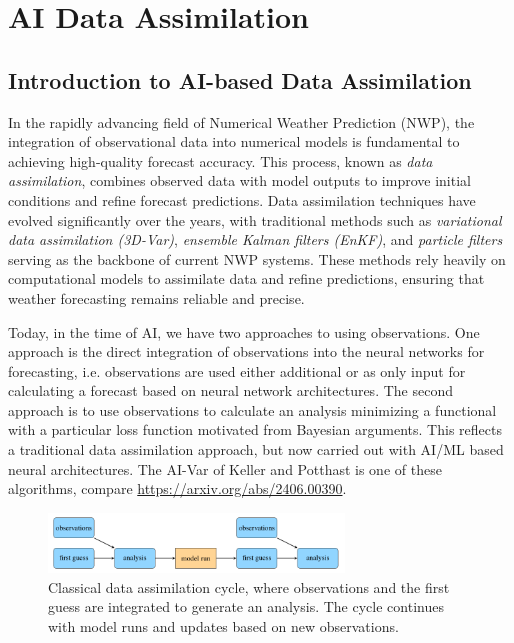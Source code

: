 \chapter{AI Data Assimilation}


%
\section{Introduction to AI-based Data Assimilation}

In the rapidly advancing field of Numerical Weather Prediction (NWP), the integration of observational data into numerical models is fundamental to achieving high-quality forecast accuracy. This process, known as \textit{data assimilation}, combines observed data with model outputs to improve initial conditions and refine forecast predictions. Data assimilation techniques have evolved significantly over the years, with traditional methods such as \textit{variational data assimilation (3D-Var)}, \textit{ensemble Kalman filters (EnKF)}, and \textit{particle filters} serving as the backbone of current NWP systems. These methods rely heavily on computational models to assimilate data and refine predictions, ensuring that weather forecasting remains reliable and precise.

Today, in the time of AI, we have two approaches to using observations. One approach is the direct integration of observations into the neural networks for forecasting, i.e. observations are used either additional or as only input for calculating a forecast based on neural network architectures. The second approach is to use observations to calculate an analysis minimizing a functional with a particular loss function motivated from Bayesian arguments. This reflects a traditional data assimilation approach, but now carried out with AI/ML based neural architectures. The AI-Var of Keller and Potthast is one of these algorithms, compare \url{https://arxiv.org/abs/2406.00390}. 

\begin{figure}[ht]
\centering
\includegraphics[width=0.7\textwidth]{images/aivar3.png}
\caption{Classical data assimilation cycle, where observations and the first guess are integrated to generate an analysis. The cycle continues with model runs and updates based on new observations.}
\end{figure}


